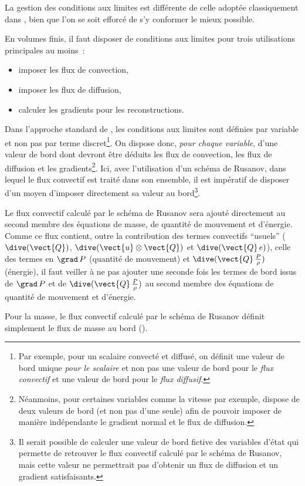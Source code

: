 La gestion des conditions aux limites est différente de celle adoptée
classiquement dans \CS, bien que l'on se soit efforcé de s'y conformer le
mieux possible.

En volumes finis, il faut disposer de conditions aux
limites pour trois utilisations principales au moins~:
         \begin{itemize}
        \item imposer les flux de convection,
        \item imposer les flux de diffusion,
        \item calculer les gradients pour les reconstructions.
        \end{itemize}
Dans l'approche standard de \CS, les conditions aux limites sont définies par
variable et non pas par terme discret\footnote{Par exemple, pour un scalaire
convecté et diffusé, on définit une valeur de bord unique {\it pour le scalaire}
et non pas une valeur de bord pour le {\it flux convectif} et une valeur de bord
pour le {\it flux diffusif}.}. On dispose donc, {\it pour chaque variable},
d'une valeur de bord dont devront être déduits les flux de
convection, les flux de diffusion et les gradients\footnote{Néanmoins, pour
certaines variables comme la vitesse par exemple, \CS dispose de deux valeurs
de bord (et non pas d'une seule) afin de pouvoir imposer de manière
indépendante le gradient normal et le flux de diffusion.}.
Ici, avec l'utilisation d'un schéma de
Rusanov, dans lequel le flux convectif est traité dans son ensemble,
il est impératif
de disposer d'un moyen d'imposer directement sa valeur au bord\footnote{Il
serait possible de calculer une valeur de bord fictive des variables d'état qui
permette de retrouver le flux convectif calculé par le schéma de Rusanov,
mais cette valeur ne permettrait pas d'obtenir
un flux de diffusion et un gradient satisfaisants.}.

Le flux convectif calculé par le schéma de Rusanov
sera ajouté directement au second membre
des équations de masse, de quantité de mouvement et d'énergie. Comme ce
flux contient, outre la contribution des termes convectifs ``usuels''
($\dive(\vect{Q})$, $\dive(\vect{u}\otimes\vect{Q})$ et
$\dive(\vect{Q}\,e)$), celle des termes en $\grad\,P$ (quantité de
mouvement) et $\dive(\vect{Q}\,\frac{P}{\rho})$
(énergie), il faut veiller à ne pas
ajouter une seconde fois les termes de bord issus de  $\grad\,P$ et de
$\dive(\vect{Q}\,\frac{P}{\rho})$
au second membre des équations de quantité de
mouvement et d'énergie.


Pour la masse, le flux convectif calculé par le schéma de Rusanov
définit simplement le flux de masse au bord
().

